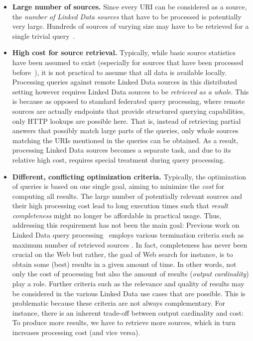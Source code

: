 \begin{itemize}
\item \textbf{Large number of sources.} Since every URI can be
  considered as a source, the \emph{number of Linked Data sources}
  that have to be processed is potentially very large. Hundreds of
  sources of varying size may have to be retrieved for a single
  trivial query~\cite{ladwig_linked_2010}.

\item \textbf{High cost for source retrieval.} Typically, while basic
  source statistics have been assumed to exist (especially for sources
  that have been processed before~\cite{ladwig_linked_2010}), it is
  not practical to assume that all data is available
  locally. Processing queries against remote Linked Data sources in
  this distributed setting however requires Linked Data sources to be
  \emph{retrieved as a whole}. This is because as opposed to standard
  federated query processing, where remote sources are actually
  endpoints that provide structured querying capabilities, only HTTP
  lookups are possible here. That is, instead of retrieving partial
  answers that possibly match large parts of the queries, only whole
  sources matching the URIs mentioned in the queries can be
  obtained. As a result, processing Linked Data sources becomes a
  separate task, and due to its relative high cost, requires special
  treatment during query processing.

\item \textbf{Different, conflicting optimization criteria.}
  Typically, the optimization of queries is based on one single goal,
  aiming to minimize the \emph{cost} for computing all results. The
  large number of potentially relevant sources and their high
  processing cost lead to long execution times such that \emph{result
    completeness} might no longer be affordable in practical
  usage. Thus, addressing this requirement has not been the main goal:
  Previous work on Linked Data query
  processing~\cite{hartig_executing_2009,harth_data_2010,ladwig_linked_2010}
  employs various termination criteria such as maximum number of
  retrieved sources \cite{harth_data_2010}. In fact, completeness has
  never been crucial on the Web but rather, the goal of Web search for
  instance, is to obtain some (best) results in a given amount of
  time. In other words, not only the cost of processing but also the
  amount of results (\emph{output cardinality}) play a role. Further
  criteria such as the relevance and quality of results may be
  considered in the various Linked Data use cases that are
  possible. This is problematic because these criteria are not always
  complementary. For instance, there is an inherent trade-off between
  output cardinality and cost: To produce more results, we have to
  retrieve more sources, which in turn increases processing cost (and
  vice versa).
\end{itemize}

